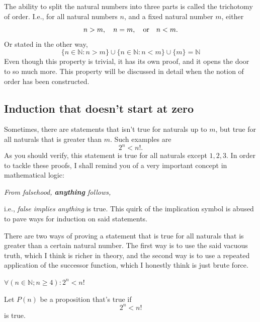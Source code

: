 \begin{remark}{}{}
  The ability to split the natural numbers into three parts is called the trichotomy of order. I.e.,
  for all natural numbers \(n\), and a fixed natural number \(m\), either
  \begin{equation*}
    n > m, \quad n = m, \quad\textrm{or}\quad n < m.
  \end{equation*}
  Or stated in the other way,
  \begin{equation*}
    \{n \in \mathbb{N} : n > m\} \cup \{n \in \mathbb{N} : n < m\} \cup \{m\} = \mathbb{N}
  \end{equation*}
  Even though this property is trivial, it has its own proof, and it opens the door to so much more.
  This property will be discussed in detail when the notion of order has been constructed.
\end{remark}

\subsection{Induction that doesn't start at zero}
\label{sec:naturals-induction_after_zero}

Sometimes, there are statements that isn't true for naturals up to \(m\), but true for all naturals
that is greater than \(m\). Such examples are
\begin{equation*}
  2^n < n!.
\end{equation*}
As you should verify, this statement is true for all naturals except \(1, 2, 3\). In order to tackle
these proofs, I shall remind you of a very important concept in mathematical logic:
\begin{displayquote}
  \emph{From falsehood, \textbf{anything} follows,}
\end{displayquote}
i.e., \emph{false implies anything} is true. This quirk of the implication symbol is abused to pave
ways for induction on said statements.

There are two ways of proving a statement that is true for all naturals that is greater than a
certain natural number. The first way is to use the said vacuous truth, which I think is richer in
theory, and the second way is to use a repeated application of the successor function, which I
honestly think is just brute force.

\begin{prop}{}{}
  \(\forall (n \in \mathbb{N} ; n \geq 4) : 2^n < n!\)
\end{prop}

Let \(P(n)\) be a proposition that's true if
\begin{equation*}
  2^n < n!
\end{equation*}
is true.

